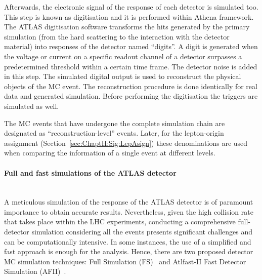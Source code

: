 Afterwards, the electronic signal of the response of each detector is simulated too. This
step is known as digitisation and it is performed within Athena framework. %
The ATLAS digitisation software transforms the hits generated 
by the primary simulation (from the hard scattering to the interaction with the detector material) 
into responses of the detector named ``digits''.
A digit is generated when the voltage or current on a specific readout channel
of a detector surpasses a predetermined threshold within a certain time frame.
The detector noise is added in this step.
The simulated digital output is used to 
reconstruct the physical objects of the MC event. The reconstruction procedure is 
done identically for real data and generated simulation. %
Before performing the
digitisation the triggers are simulated as well.

The MC events that have undergone the complete simulation chain 
are designated as ``reconstruction-level'' events. Later, for the
lepton-origin assignment (Section~\ref{sec:ChaptH:Sig:LepAsign})
these denominations are used when comparing the information of 
a single event at different levels.

\paragraph{Full and fast simulations of the ATLAS detector}\mbox{}\\
A meticulous simulation of the response of the ATLAS detector
is of paramount importance to obtain accurate results.
Nevertheless, given the high collision rate that takes
place within the LHC experiments, conducting a comprehensive full-detector simulation
considering all the events presents significant challenges and can 
be computationally intensive.
In some instances, the use of a simplified and fast approach is 
enough for the analysis. Hence, there are two proposed 
detector MC simulation techniques: Full Simulation (FS)~\cite{SOFT-2010-01} and Atlfast-II Fast 
Detector Simulation (AFII)~\cite{ATLAS:2010bfa, SOFT-2010-01}.

